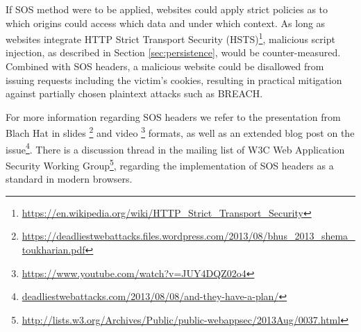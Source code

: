 If SOS method were to be applied, websites could apply strict policies as to
which origins could access which data and under which context. As long as
websites integrate HTTP Strict Transport Security (HSTS)\footnote{\url{https://en.wikipedia.org/wiki/HTTP_Strict_Transport_Security}},
malicious script injection, as described in Section \ref{sec:persistence}, would
be counter-measured. Combined with SOS headers, a malicious website could be
disallowed from issuing requests including the victim's cookies, resulting in
practical mitigation against partially chosen plaintext attacks such as BREACH.

For more information regarding SOS headers we refer to the presentation from
Blach Hat in slides
\footnote{\url{https://deadliestwebattacks.files.wordpress.com/2013/08/bhus_2013_shema_toukharian.pdf}}
and video \footnote{\url{https://www.youtube.com/watch?v=JUY4DQZ02o4}} formats,
as well as an extended blog post on the issue\footnote{\url{deadliestwebattacks.com/2013/08/08/and-they-have-a-plan/}}. There
is a discussion thread in the mailing list of W3C Web Application Security
Working Group\footnote{\url{http://lists.w3.org/Archives/Public/public-webappsec/2013Aug/0037.html}},
regarding the implementation of SOS headers as a standard in modern browsers.
